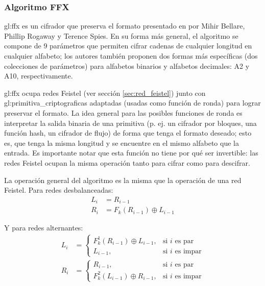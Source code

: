 %
%

\subsubsection{Algoritmo FFX}

\Gls{gl:ffx} es un cifrador que preserva el formato presentado en \cite{ffx_1}
por Mihir Bellare, Phillip Rogaway y Terence Spies.  En su forma más general,
el algoritmo se compone de 9 parámetros que permiten cifrar cadenas de
cualquier longitud en cualquier alfabeto; los autores también proponen dos
formas más específicas (dos colecciones de parámetros) para alfabetos binarios
y alfabetos decimales: A2 y A10, respectivamente.

\Gls{gl:ffx} ocupa redes Feistel (ver sección \ref{sec:red_feistel}) junto con
\glspl{gl:primitiva_criptografica} adaptadas (usadas como función de ronda) para
lograr preservar el formato. La idea general para las posibles funciones de
ronda es interpretar la salida binaria de una primitiva (p. ej. un cifrador por
bloques, una función hash, un cifrador de flujo) de forma que tenga el formato
deseado; esto es, que tenga la misma longitud y se encuentre en el mismo
alfabeto que la entrada. Es importante notar que esta función no tiene por qué
ser invertible: las redes Feistel ocupan la misma operación tanto para cifrar
como para descifrar.

La operación general del algoritmo es la misma que la operación de una red
Feistel. Para redes desbalanceadas:
\begin{equation}
  \begin{split}
    L_{i} &= R_{i - 1} \\
    R_{i} &= F_k(R_{i - 1}) \oplus L_{i - 1}
  \end{split}
\end{equation}

Y para redes alternantes:
\begin{equation}
  \begin{split}
    L_{i} &=
    \begin{cases}
      F^1_k(R_{i - 1}) \oplus L_{i - 1},  & \text{si } i \text{ es par} \\
      L_{i - 1},                          & \text{si } i \text{ es impar}
    \end{cases}
    \\
    R_{i} &=
    \begin{cases}
      R_{i - 1},                          & \text{si } i \text{ es par} \\
      F^2_k(L_{i - 1}) \oplus R_{i - 1},  & \text{si } i \text{ es impar}
    \end{cases}
  \end{split}
\end{equation}

